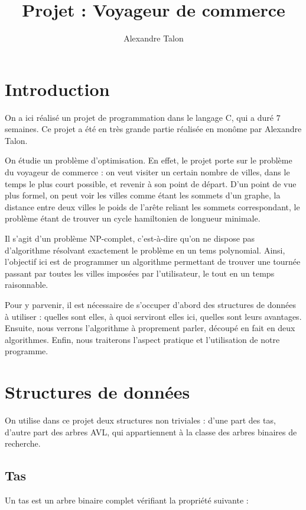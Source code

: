 \documentclass{article}
\title{Projet : Voyageur de commerce}
\author{Alexandre Talon}
\begin{document}
\maketitle
\tableofcontents
\section*{Introduction}
On a ici réalisé un projet de programmation dans le langage C, qui a duré $7$ semaines. Ce projet a été en très grande partie réalisée en monôme par Alexandre Talon.

On étudie un problème d'optimisation. En effet, le projet porte sur le problème du voyageur de commerce : on veut visiter un certain nombre de villes, dans le temps le plus court possible, et revenir à son point de départ. D'un point de vue plus formel, on peut voir les villes comme étant les sommets d'un graphe, la distance entre deux villes le poids de l'arête reliant les sommets correspondant, le problème étant de trouver un cycle hamiltonien de longueur minimale.


Il s'agit d'un problème NP-complet, c'est-à-dire qu'on ne dispose pas d'algorithme résolvant exactement le problème en un tems polynomial. Ainsi, l'objectif ici est de programmer un algorithme permettant de trouver une tournée passant par toutes les villes imposées par l'utilisateur, le tout en un temps raisonnable.


Pour y parvenir, il est nécessaire de s'occuper d'abord des structures de données à utiliser : quelles sont elles, à quoi serviront elles ici, quelles sont leurs avantages. Ensuite, nous verrons l'algorithme à proprement parler, découpé en fait en deux algorithmes. Enfin, nous traiterons l'aspect pratique et l'utilisation de notre programme.

\section{Structures de données}

On utilise dans ce projet deux structures non triviales : d'une part des tas, d'autre part des arbres AVL, qui appartiennent à la classe des arbres binaires de recherche.
\subsection{Tas}
Un tas est un arbre binaire complet vérifiant la propriété suivante :
\end{document}
